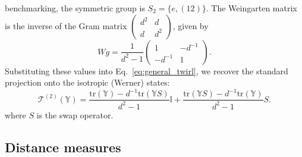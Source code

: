 \documentclass{article}
\theoremstyle{definition}
\newcommand{\Tr}{\text{tr}}
\begin{document}
    benchmarking, the symmetric group is $S_{2}= \{e, (12)\}$. The Weingarten
    matrix is the inverse of the Gram matrix $\begin{pmatrix}
        d^{2} & d     \\
        d     & d^{2}
    \end{pmatrix}$, given by
    \begin{equation}
        Wg = \frac{1}{d^{2}- 1}
        \begin{pmatrix}
            1       & -d^{-1} \\
            -d^{-1} & 1
        \end{pmatrix}.
    \end{equation}
    Substituting these values into Eq.~\eqref{eq:general_twirl}, we recover the
    standard projection onto the isotropic (Werner) states:
    \begin{equation}
        \mathcal{T}^{(2)}(\mathbb{Y}) = \frac{\Tr(\mathbb{Y}) - d^{-1}\Tr(\mathbb{Y}S)}{d^{2}-1}
        \mathbb{I}+ \frac{\Tr(\mathbb{Y}S) - d^{-1}\Tr(\mathbb{Y})}{d^{2}-1}S.
    \end{equation}
    where $S$ is the swap operator.

    \subsection{Distance measures}
\end{document}
